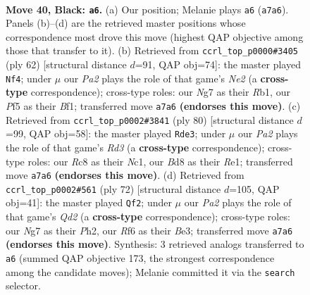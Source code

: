 \documentclass[11pt]{article}
\begin{document}
\clearpage

\begin{figure}[p]\centering
\begin{subfigure}{0.46\textwidth}\centering
\resizebox{\linewidth}{!}{%
\newchessgame
\chessboard[
  setfen={n1rb2k1/pb1q2n1/5r2/P1p2p1p/3p1Pp1/1P4P1/2RBP1BP/RQ1NN1K1 b - - 13 40},
  showmover=false,
  pgfstyle=straightmove, color=movearrow, markmove={a7-a6}
]}
\caption{}
\end{subfigure}\hfill
\begin{subfigure}{0.46\textwidth}\centering
\resizebox{\linewidth}{!}{%
\newchessgame
\chessboard[
  setfen={bqrr2k1/3nbpp1/pp1pp1np/8/NPP1P3/PQ3PBP/4N1P1/1R1R1B1K w - - 13 32},
  showmover=false,
  pgfstyle=straightmove, color=movearrow, markmove={e2-f4}
]}
\caption{}
\end{subfigure}
\\[4pt]
\begin{subfigure}{0.46\textwidth}\centering
\resizebox{\linewidth}{!}{%
\newchessgame
\chessboard[
  setfen={2qr3k/3br1p1/2p1pbnp/1pP2p2/3P1P2/PB1R2PP/1B1Q2K1/2N1R3 w - - 1 41},
  showmover=false,
  pgfstyle=straightmove, color=movearrow, markmove={d3-e3}
]}
\caption{}
\end{subfigure}\hfill
\begin{subfigure}{0.46\textwidth}\centering
\resizebox{\linewidth}{!}{%
\newchessgame
\chessboard[
  setfen={bq1r2k1/2rn1pp1/pp1ppbnp/8/NPPNP3/P3BP2/3Q2PP/2RR1B1K w - - 19 37},
  showmover=false,
  pgfstyle=straightmove, color=movearrow, markmove={d2-f2}
]}
\caption{}
\end{subfigure}
\caption{\textbf{Move 40, Black: \texttt{a6}.} (a) Our position; Melanie plays \texttt{a6} (\texttt{a7a6}). Panels (b)--(d) are the retrieved master positions whose correspondence most drove this move (highest QAP objective among those that transfer to it). (b) Retrieved from \texttt{ccrl\_top\_p0000\#3405} (ply 62) [structural distance $d$=91, QAP obj=74]: the master played \texttt{Nf4}; under $\mu$ our \emph{Pa2} plays the role of that game's \emph{Ne2} (a \textbf{cross-type} correspondence); cross-type roles: our \emph{N}g7 as their \emph{R}b1, our \emph{P}f5 as their \emph{B}f1; transferred move \texttt{a7a6} \textbf{(endorses this move)}. (c) Retrieved from \texttt{ccrl\_top\_p0002\#3841} (ply 80) [structural distance $d$=99, QAP obj=58]: the master played \texttt{Rde3}; under $\mu$ our \emph{Pa2} plays the role of that game's \emph{Rd3} (a \textbf{cross-type} correspondence); cross-type roles: our \emph{R}c8 as their \emph{N}c1, our \emph{B}d8 as their \emph{R}e1; transferred move \texttt{a7a6} \textbf{(endorses this move)}. (d) Retrieved from \texttt{ccrl\_top\_p0002\#561} (ply 72) [structural distance $d$=105, QAP obj=41]: the master played \texttt{Qf2}; under $\mu$ our \emph{Pa2} plays the role of that game's \emph{Qd2} (a \textbf{cross-type} correspondence); cross-type roles: our \emph{N}g7 as their \emph{P}h2, our \emph{R}f6 as their \emph{B}e3; transferred move \texttt{a7a6} \textbf{(endorses this move)}. Synthesis: 3 retrieved analogs transferred to \texttt{a6} (summed QAP objective 173, the strongest correspondence among the candidate moves); Melanie committed it via the \texttt{search} selector.}

\end{figure}
\end{document}
